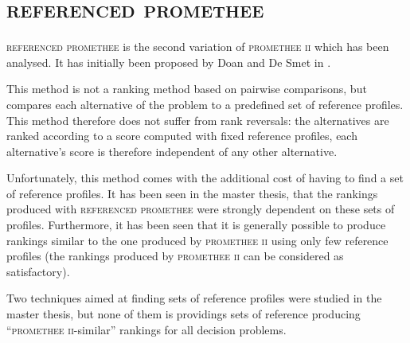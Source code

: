\documentclass[conference,compsoc]{IEEEtran}
\begin{document}
\section{\textsc{referenced promethee}}

\textsc{referenced promethee} is the second variation of \textsc{promethee ii} which has been analysed.
It has initially been proposed by Doan and De Smet in \cite{RefPII}.

This method is not a ranking method based on pairwise comparisons, but compares each alternative of the problem to a predefined set of reference profiles.
This method therefore does not suffer from rank reversals: the alternatives are ranked according to a score computed with fixed reference profiles, each alternative's score is therefore independent of any other alternative.

Unfortunately, this method comes with the additional cost of having to find a set of reference profiles. 
It has been seen in the master thesis, that the rankings produced with \textsc{referenced promethee} were strongly dependent on these sets of profiles. Furthermore, it has been seen that it is generally possible to produce rankings similar to the one produced by \textsc{promethee ii} using only few reference profiles (the rankings produced by \textsc{promethee ii} can be considered as satisfactory).

Two techniques aimed at finding sets of reference profiles were studied in the master thesis, but none of them is providings sets of reference producing ``\textsc{promethee ii}-similar'' rankings for all decision problems.


%
%
\end{document}
